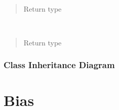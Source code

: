\documentclass[letterpaper,10pt,english]{sphinxmanual}
\begin{document}
\begin{fulllineitems}
\begin{fulllineitems}
\label{\detokenize{api/seyfert.cosmology.redshift_density.RedshiftDensity:seyfert.cosmology.redshift_density.RedshiftDensity.saveToHDF5}}~\begin{quote}\begin{description}
\item[{Return type}] \leavevmode
\sphinxAtStartPar
{}

\end{description}\end{quote}

\end{fulllineitems}


\begin{fulllineitems}
\label{\detokenize{api/seyfert.cosmology.redshift_density.RedshiftDensity:seyfert.cosmology.redshift_density.RedshiftDensity.setUp}}~\begin{quote}\begin{description}
\item[{Return type}] \leavevmode
\sphinxAtStartPar
{}

\end{description}\end{quote}

\end{fulllineitems}


\end{fulllineitems}



\subsubsection{Class Inheritance Diagram}
\label{\detokenize{redshift_density:class-inheritance-diagram}}


\section{Bias}
\label{\detokenize{bias:bias}}\label{\detokenize{bias::doc}}
\end{document}

